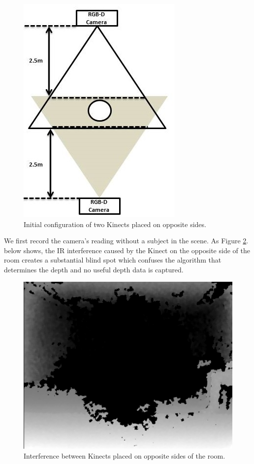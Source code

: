 \documentclass[a4paper]{article}
\begin{document}
\begin{figure}[H]
\centering
\includegraphics[scale=0.4]{figure_2cameras_opposite.jpg}
\caption{Initial configuration of two Kinects placed on opposite sides.}
\label{2_cameras_config1}
\end{figure}

We first record the camera's reading without a subject in the scene. As Figure \ref{IR_interference}. below shows, the IR interference caused by the Kinect on the opposite side of the room creates a substantial blind spot which confuses the algorithm that determines the depth and no useful depth data is captured.

\begin{figure}[H]
\centering
\includegraphics[scale=0.2]{IR_Interference2.jpg}
\caption{Interference between Kinects placed on opposite sides of the room.}
\label{IR_interference}
\end{figure}
\end{document}
